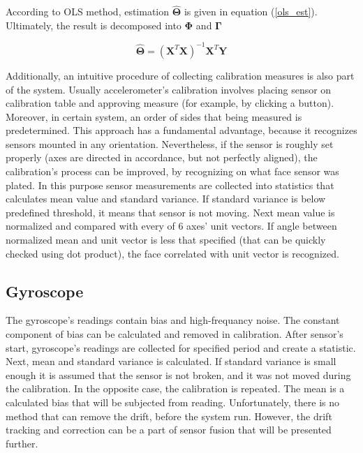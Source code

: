 According to OLS method, estimation $\bm{\hat{\Theta}}$ is given in equation (\ref{ols_est}). Ultimately, the result is decomposed into $\bm{\Phi}$ and $\bm{\Gamma}$

\begin{equation}
	\bm{\hat{\Theta}} = \left( \bm{X}^T \bm{X} \right)^{-1} \bm{X}^T \bm{Y}
	\label{ols_est}
\end{equation}

Additionally, an intuitive procedure of collecting calibration measures is also part of the system. Usually accelerometer's calibration involves placing sensor on calibration table and approving measure (for example, by clicking a button). Moreover, in certain system, an order of sides that being measured is predetermined. This approach has a fundamental advantage, because it recognizes sensors mounted in any orientation. Nevertheless, if the sensor is roughly set properly (axes are directed in accordance, but not perfectly aligned), the calibration's process can be improved, by recognizing on what face sensor was plated. In this purpose sensor measurements are collected into statistics that calculates mean value and standard variance. If standard variance is below predefined threshold, it means that sensor is not moving. Next mean value is normalized and compared with every of 6 axes' unit vectors. If angle between normalized mean and unit vector is less that specified (that can be quickly checked using dot product), the face correlated with unit vector is recognized.



\subsection{Gyroscope}

The gyroscope's readings contain bias and high-frequancy noise. The constant component of bias can be calculated and removed in calibration. After sensor's start, gyroscope's readings are collected for specified period and create a statistic. Next, mean and standard variance is calculated. If standard variance is small enough it is assumed that the sensor is not broken, and it was not moved during the calibration. In the opposite case, the calibration is repeated. The mean is a calculated bias that will be subjected from reading.
Unfortunately, there is no method that can remove the drift, before the system run. However, the drift tracking and correction can be a part of sensor fusion that will be presented further.\\

